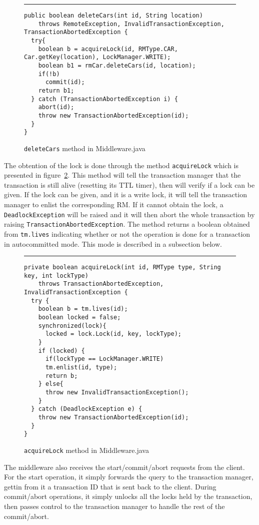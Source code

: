 \documentclass[12pt]{article}
\theoremstyle{plain}%
\theoremstyle{definition}
\theoremstyle{remark}
\newcommand{\java}[1]{{\lstinline!#1!}}
\newenvironment{figureone}[1]{%
  \def\deffigurecaption{#1}%
  \begin{figure}[htbp]%
  \begin{center}%
  \begin{minipage}{\columnwidth}%
  \hrule \vspace*{2ex}%
}{%
  \end{minipage}%
  \end{center}%
  \caption{\deffigurecaption}%
  \end{figure}%
}
\begin{document}
\begin{figureone}{\java{deleteCars} method in Middleware.java \label{fig:operation}}
\begin{lstlisting}
public boolean deleteCars(int id, String location)
    throws RemoteException, InvalidTransactionException, TransactionAbortedException {
  try{
    boolean b = acquireLock(id, RMType.CAR, Car.getKey(location), LockManager.WRITE);
    boolean b1 = rmCar.deleteCars(id, location);
    if(!b)
      commit(id);
    return b1;
  } catch (TransactionAbortedException i) {
    abort(id);
    throw new TransactionAbortedException(id);
  }
}
\end{lstlisting}
\end{figureone}

The obtention of the lock is done through the method \java{acquireLock} which is presented in figure~\ref{fig:acquireLock}. This method will tell the transaction manager that the transaction is still alive (resetting its TTL timer), then will verify if a lock can be given. If the lock can be given, and it is a write lock, it will tell the transaction manager to enlist the corresponding RM. If it cannot obtain the lock, a \java{DeadlockException} will be raised and it will then abort the whole transaction by raising \java{TransactionAbortedException}. The method returns a boolean obtained from \java{tm.lives} indicating whether or not the operation is done for a transaction in autocommitted mode. This mode is described in a subsection below.

\begin{figureone}{\java{acquireLock} method in Middleware.java \label{fig:acquireLock}}
\begin{lstlisting}
private boolean acquireLock(int id, RMType type, String key, int lockType) 
    throws TransactionAbortedException, InvalidTransactionException {
  try {
    boolean b = tm.lives(id);
    boolean locked = false;
    synchronized(lock){
      locked = lock.Lock(id, key, lockType);
    }
    if (locked) {
      if(lockType == LockManager.WRITE)
      tm.enlist(id, type);
      return b;
    } else{
      throw new InvalidTransactionException();
    }
  } catch (DeadlockException e) {
    throw new TransactionAbortedException(id);
  }
}
\end{lstlisting}
\end{figureone}

The middleware also receives the start/commit/abort requests from the client. For the start operation, it simply forwards the query to the transaction manager, gettin from it a transaction ID that is sent back to the client. During commit/abort operations, it simply unlocks all the locks held by the transaction, then passes control to the transaction manager to handle the rest of the commit/abort.
\end{document}
